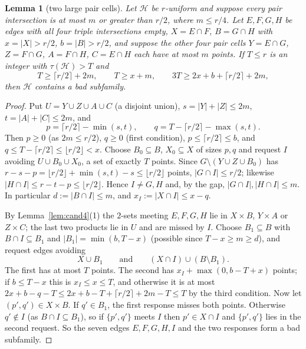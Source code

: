 \documentclass[11pt]{amsart}
\newtheorem{lemma}[theorem]{Lemma}
\theoremstyle{definition}
\theoremstyle{remark}
\newcommand{\cH}{\mathcal H}
\newcommand{\ceil}[1]{\lceil #1\rceil}
\newcommand{\floor}[1]{\lfloor #1\rfloor}
\begin{document}
\begin{lemma}[two large pair cells]\label{lem:L41}
Let $\cH$ be $r$-uniform and suppose every pair intersection is at most $m$ or greater than $r/2$, where $m\le r/4$. Let $E,F,G,H$ be edges with all four triple intersections empty, $X=E\cap F$, $B=G\cap H$ with $x=|X|>r/2$, $b=|B|>r/2$, and suppose the other four pair cells $Y=E\cap G$, $Z=F\cap G$, $A=F\cap H$, $C=E\cap H$ each have at most $m$ points. If $T\le r$ is an integer with $\tau(\cH)>T$ and
\[
T\ge\ceil{r/2}+2m,\qquad T\ge x+m,\qquad 3T\ge2x+b+\ceil{r/2}+2m,
\]
then $\cH$ contains a bad subfamily.
\end{lemma}
\begin{proof}
Put $U=Y\cup Z\cup A\cup C$ (a disjoint union), $s=|Y|+|Z|\le2m$, $t=|A|+|C|\le2m$, and
\[
p=\ceil{r/2}-\min(s,t),\qquad q=T-\ceil{r/2}-\max(s,t).
\]
Then $p\ge0$ (as $2m\le r/2$), $q\ge0$ (first condition), $p\le\ceil{r/2}\le b$, and $q\le T-\ceil{r/2}\le\floor{r/2}<x$. Choose $B_0\subseteq B$, $X_0\subseteq X$ of sizes $p,q$ and request $I$ avoiding $U\cup B_0\cup X_0$, a set of exactly $T$ points. Since $G\setminus(Y\cup Z\cup B_0)$ has $r-s-p=\floor{r/2}+\min(s,t)-s\le\floor{r/2}$ points, $|G\cap I|\le r/2$; likewise $|H\cap I|\le r-t-p\le\floor{r/2}$. Hence $I\ne G,H$ and, by the gap, $|G\cap I|,|H\cap I|\le m$. In particular $d:=|B\cap I|\le m$, and $x_I:=|X\cap I|\le x-q$.

By Lemma~\ref{lem:cand4}(1) the $2$-sets meeting $E,F,G,H$ lie in $X\times B$, $Y\times A$ or $Z\times C$; the last two products lie in $U$ and are missed by $I$. Choose $B_1\subseteq B$ with $B\cap I\subseteq B_1$ and $|B_1|=\min(b,T-x)$ (possible since $T-x\ge m\ge d$), and request edges avoiding
\[
X\cup B_1\qquad\text{and}\qquad (X\cap I)\cup(B\setminus B_1).
\]
The first has at most $T$ points. The second has $x_I+\max(0,b-T+x)$ points; if $b\le T-x$ this is $x_I\le x\le T$, and otherwise it is at most $2x+b-q-T\le 2x+b-T+\ceil{r/2}+2m-T\le T$ by the third condition. Now let $(p',q')\in X\times B$. If $q'\in B_1$, the first response misses both points. Otherwise $q'\notin I$ (as $B\cap I\subseteq B_1$), so if $\{p',q'\}$ meets $I$ then $p'\in X\cap I$ and $\{p',q'\}$ lies in the second request. So the seven edges $E,F,G,H,I$ and the two responses form a bad subfamily.
\end{proof}
\end{document}
